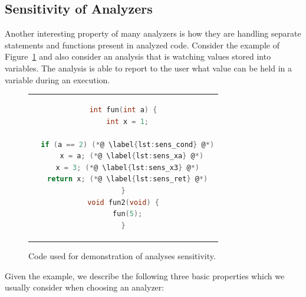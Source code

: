 \subsection{Sensitivity of Analyzers}\label{sec:sensitivity}
Another interesting property of many analyzers is how they are handling
separate statements and functions present in analyzed code. Consider the
example of Figure~\ref{fig:lst_sens} and also consider an analysis that is
watching values stored into variables. The analysis is able to report to the
user what value can be held in a variable during an execution.
\begin{figure}[htb]
\begin{center}
\begin{tabular}{c}
\begin{lstlisting}[language=C]
int fun(int a) {
  int x = 1;

  if (a == 2) (*@ \label{lst:sens_cond} @*)
    x = a; (*@ \label{lst:sens_xa} @*)
  x = 3; (*@ \label{lst:sens_x3} @*)
  return x; (*@ \label{lst:sens_ret} @*)
}
void fun2(void) {
  fun(5);
}
\end{lstlisting}
\end{tabular}
\end{center}
\caption{Code used for demonstration of analyses sensitivity.}
\label{fig:lst_sens}
\end{figure}
Given the example, we describe the following three basic properties which we
usually consider when choosing an analyzer:
